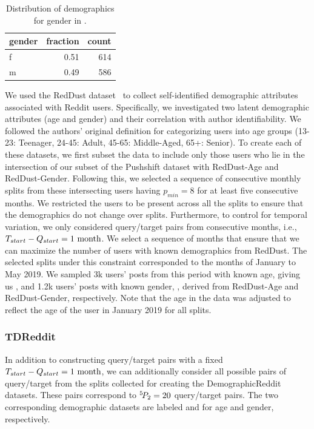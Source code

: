 \begin{table}[]
    \centering
    \begin{tabular}{lrr}
    \toprule
    gender & fraction & count \\
    \midrule
    f & 0.51 & 614 \\
    m & 0.49 & 586 \\
    \bottomrule
    \end{tabular}
    \caption{Distribution of demographics for gender in \DSgenderfixed{}.}
    \label{tab:demographics:gender_dist}
\end{table}

We used the RedDust dataset~\cite{tigunova2020reddust} to collect self-identified demographic attributes associated with Reddit users. 
Specifically, we investigated two latent demographic attributes (age and gender) and their correlation with author identifiability.
We followed the authors' original definition for categorizing users into age groups (13-23: Teenager, 24-45: Adult, 45-65: Middle-Aged, 65+: Senior).
To create each of these datasets, we first subset the data to include only those users who lie in the intersection of our subset of the Pushshift dataset with RedDust-Age and RedDust-Gender. 
Following this, we selected a sequence of consecutive monthly splits from these intersecting users having $p_{min} = 8$ for at least five consecutive months. 
We restricted the users to be present across all the splits to ensure that the demographics do not change over splits.
Furthermore, to control for temporal variation, we only considered query/target pairs from consecutive months, i.e., $T_{start} - Q_{start} = 1~\rm{month}$.
We select a sequence of months that ensure that we can maximize the number of users with known demographics from RedDust.
The selected splits under this constraint corresponded to the months of January to May 2019.
We sampled 3k users' posts from this period with known age, giving us \DSagefixed{}, and 1.2k users' posts with known gender, \DSgenderfixed{}, derived from RedDust-Age and RedDust-Gender, respectively.
Note that the age in the data was adjusted to reflect the age of the user in January 2019 for all splits.

\subsubsection{TDReddit}
In addition to constructing query/target pairs with a fixed $T_{start} - Q_{start} = 1~\rm{month}$, we can additionally consider all possible pairs of query/target from the splits collected for creating the DemographicReddit datasets.
These pairs correspond to ${}^{5}\!P_{2} = 20$ query/target pairs.
The two corresponding demographic datasets are labeled \DSagevary{} and \DSgendervary{} for age and gender, respectively.

